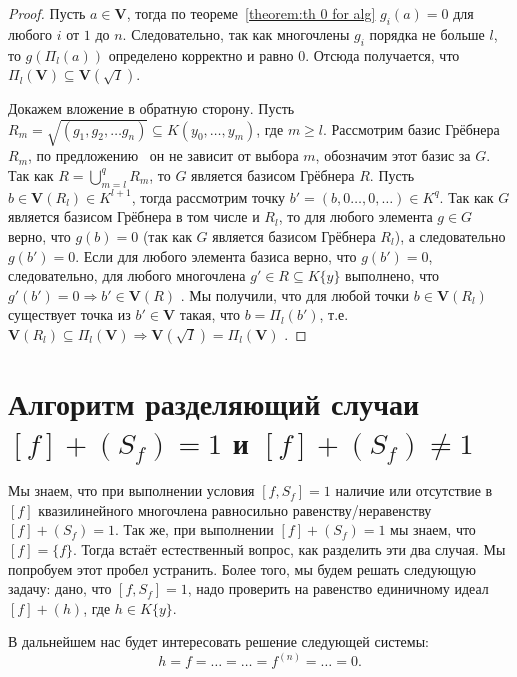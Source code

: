 \documentclass[16pt]{article}
\newcommand{\orange}[1]{{\color{orange}#1}}
\theoremstyle{plain}
\theoremstyle{definition}
\theoremstyle{remark}
\begin{document}
\begin{proof}
Пусть $a\in \mathbf{V}$, тогда по теореме~\ref{theorem:th 0 for alg} $g_i(a)=0$ для любого $i$ от $1$ до $n$. Следовательно, так как многочлены $g_i$  порядка не больше $l$, то $g(\Pi_l(a))$ определено корректно и равно 0. Отсюда получается, что $\Pi_l(\mathbf{V})\subseteq\mathbf{V}(\sqrt{I})$.

Докажем вложение в обратную сторону. Пусть $R_m=\sqrt{(g_1,g_2,\ldots g_n)}\subseteq K(y_0,\ldots,y_m)$, где $m\geq l$. Рассмотрим базис Грёбнера $R_m$, по предложению~\cite[Chapter~IV, Section~2, Suggestion~8]{Cox} он не зависит от выбора $m$, обозначим этот базис за $G$. Так как  $R=\bigcup\limits_{m=l}^{q}R_m$, то $G$ является базисом Грёбнера  $R$. Пусть $b\in\mathbf{V}(R_l)\in K^{l+1}$, тогда рассмотрим точку $b'=(b,0\ldots,0,\ldots)\in K^{q}$. Так как $G$ является базисом Грёбнера в том числе и $R_l$, то для любого элемента $g\in G$ верно, что $g(b)=0$ (так как $G$ является базисом Грёбнера $R_l$), а следовательно $g(b')=0$. Если для любого элемента базиса верно, что $g(b')=0$, следовательно, для любого многочлена  $g'\in R\subseteq K\{y\}$ выполнено, что $g'(b')=0\Rightarrow b'\in\mathbf{V}(R)$  . Мы получили, что для любой точки  $b\in\mathbf{V}(R_l)$ существует точка из $b'\in\mathbf{V}$ такая, что $b=\Pi_l(b')$, т.е. $\mathbf{V}(R_l)\subseteq\Pi_l(\mathbf{V})\Rightarrow \mathbf{V}(\sqrt{I})=\Pi_l(\mathbf{V})$ . 
\end{proof}
\section{ Алгоритм разделяющий случаи $[f]+(S_f)=1$ и $[f]+(S_f)\neq1$}


Мы знаем, что при выполнении условия $[f,S_f]=1$ наличие или отсутствие в $[f]$ квазилинейного многочлена равносильно равенству/неравенству $[f]+(S_f)=1$. Так же, при выполнении $[f]+(S_f)=1$ мы знаем, что $[f]=\{f\}$. Тогда встаёт естественный вопрос, как разделить эти два случая. Мы попробуем этот пробел устранить. Более того, мы будем решать следующую задачу: дано, что $[f,S_f]=1$, надо проверить на равенство единичному идеал $[f]+(h)$, где $h\in K\{y\}$.

В дальнейшем нас будет интересовать решение следующей системы:
\begin{equation}h=f=\ldots=\ldots=f^{(n)}=\ldots=0. \end{equation}
\end{document}
